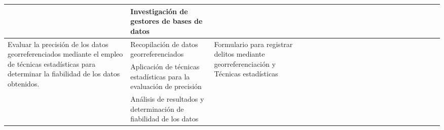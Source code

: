 \begin{landscape}
\begin{ThreePartTable}
\begin{longtable}{|p{}|p{5.5cm}|p{4cm}|l|l|l|l|l|l|l|l|l|l|l|l|l|l|l|l|l|l|l|}
            \cline{2-2}\cline{4-21}
                                                                                & Investigación de gestores de bases de datos                         &                                                                                                                     &                                       & \cellcolor{green!25}                  &                                       &                                       &                      &                      &                      &                      &                      &                      &                      &                      &                      &                      &                      \\
            \hline
            \multirow{4}{0.41\textwidth}{Evaluar la precisión de los datos georreferenciados mediante el empleo de técnicas
            estadísticas para determinar la fiabilidad de los datos obtenidos.} & Recopilación de datos georreferenciados                             & \multirow{4}{0.28\textwidth}{Formulario para registrar delitos mediante georreferenciación y Técnicas estadísticas} &                                       &                                       & \cellcolor{green!25}                  & \cellcolor{green!25}                  & \cellcolor{green!25} & \cellcolor{green!25} & \cellcolor{green!25} & \cellcolor{green!25} & \cellcolor{green!25} & \cellcolor{green!25} & \cellcolor{green!25} &                      &                      &                      &                      \\
            \cline{2-2}\cline{4-21}
                                                                                & Aplicación de técnicas estadísticas para la evaluación de precisión &                                                                                                                     &                                       &                                       &                                       &                                       &                      &                      &                      &                      &                      &                      &                      & \cellcolor{green!25} &                      &                      &                      \\
            \cline{2-2}\cline{4-21}
                                                                                & Análisis de resultados y determinación de fiabilidad de los datos   &                                                                                                                     &                                       &                                       &                                       &                                       &                      &                      &                      &                      &                      &                      &                      & \cellcolor{green!25} &                      &                      &                      \\

\end{longtable}
\end{ThreePartTable}
\end{landscape}
